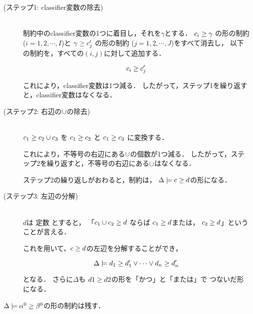 \begin{description}
\item[(ステップ1: classifier変数の除去)]\mbox{}\\
  制約中のclassifier変数の1つに着目し，それを$\gamma$とする．
  ${c_i} \ge {\gamma}$ の形の制約 ($i=1,2,\cdots,I$)と
  ${\gamma} \ge {c'_j}$ の形の制約 ($j=1,2,\cdots,J$)をすべて消去し，
  以下の制約を，すべての$(i,j)$に対して追加する．

  \[
    {c_i} \ge {c'_j}
  \]

  これにより，classifier変数は1つ減る．%
  したがって，ステップ1を繰り返すと，classifier変数はなくなる．

\item[(ステップ2: 右辺の$\cup$の除去)]\mbox{}\\
  ${c_1} \ge {c_2 \cup c_3}$ を
  ${c_1} \ge {c_2}$ と
  ${c_1} \ge {c_3}$ に変換する．

  これにより，不等号の右辺にある$\cup$の個数が1つ減る．
  したがって，ステップ2を繰り返すと，不等号の右辺にある$\cup$はなくなる．

  ステップ2の繰り返しがおわると，制約は，
  $\Delta \models {c} \ge {d}$の形になる．


\item[(ステップ3: 左辺の分解)] \mbox{}\\
  $d$は 定数 とすると，
  「${c_1 \cup c_2} \ge {d}$ ならば
  ${c_1} \ge {d}$または，
  ${c_2} \ge {d}$」ということが言える．

  これを用いて、${c} \ge {d}$の左辺を分解することができ，

  \[
    \Delta \models {d_1} \ge {d_1'} \vee \cdots \vee {d_n} \ge {d'_n}
  \]

  となる．
  さらに$\Delta$も ${d1} \ge {d2}$の形を「かつ」と「または」で
  つないだ形になる．

\end{description}

$\Delta \models {\alpha^0} \ge {\beta^0}$の形の制約は残す．



